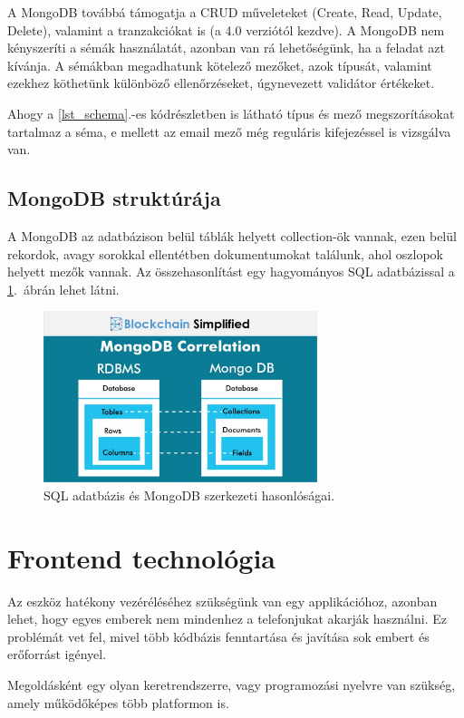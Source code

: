 \documentclass{thesis-ekf}
\theoremstyle{definition}
\theoremstyle{remark}
\begin{document}
	A MongoDB továbbá támogatja a CRUD műveleteket (Create, Read, Update, Delete), valamint a tranzakciókat is (a 4.0 verziótól kezdve).\cite{bib_mongo_sql}
	A MongoDB nem kényszeríti a sémák használatát, azonban van rá lehetőségünk, ha a feladat azt kívánja. A sémákban megadhatunk kötelező mezőket, azok típusát, valamint ezekhez köthetünk különböző ellenőrzéseket, úgynevezett validátor értékeket.
	
	
	Ahogy a \ref{lst_schema}.-es kódrészletben is látható típus és mező megszorításokat tartalmaz a séma, e mellett az email mező még reguláris kifejezéssel is vizsgálva van.
	\subsection{MongoDB struktúrája}
	A MongoDB az adatbázison belül táblák helyett collection-ök vannak, ezen belül rekordok, avagy sorokkal ellentétben dokumentumokat találunk, ahol oszlopok helyett mezők vannak. Az összehasonlítást egy hagyományos SQL adatbázissal a \ref{img_sql_mongo}.~ábrán lehet látni. \cite{bib_mongo_sql}
	 \begin{figure}[!h]
	 	\centering
	 	\includegraphics[width=8cm]{mongo_vs_sql}
	 	\caption{SQL adatbázis és MongoDB szerkezeti hasonlóságai.}
	 	\label{img_sql_mongo}
	 \end{figure}
	\section{Frontend technológia}
	Az eszköz hatékony vezéréléséhez szükségünk van egy applikációhoz, azonban lehet, hogy egyes emberek nem mindenhez a telefonjukat akarják használni. Ez problémát vet fel, mivel több kódbázis fenntartása és javítása sok embert és erőforrást igényel. 
	
	Megoldásként egy olyan keretrendszerre, vagy programozási nyelvre van szükség, amely működőképes több platformon is.
	
\end{document}
